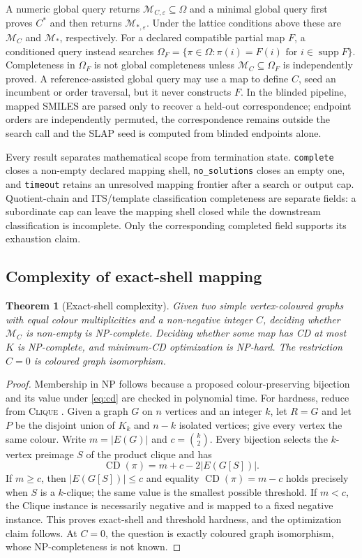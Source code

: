 \documentclass[11pt]{article}
\newtheorem{theorem}{Theorem}
\newcommand{\CD}{\operatorname{CD}}
\begin{document}
A numeric global query returns $\mathcal M_{C,\varepsilon}\subseteq\Omega$ and
a minimal global query first proves $C^*$ and then returns
$\mathcal M_{*,\varepsilon}$.  Under the lattice conditions above these are
$\mathcal M_C$ and $\mathcal M_*$, respectively.  For a declared compatible
partial map $F$, a conditioned query instead searches
$\Omega_F=\{\pi\in\Omega:\pi(i)=F(i)\text{ for }i\in\operatorname{supp}F\}$.
Completeness in $\Omega_F$ is not global completeness unless
$\mathcal M_C\subseteq\Omega_F$ is independently proved.  A
reference-assisted global query may use a map to define $C$, seed an incumbent
or order traversal, but it never constructs $F$.  In the blinded pipeline,
mapped SMILES are parsed only to recover a held-out correspondence; endpoint
orders are independently permuted, the correspondence remains outside the
search call and the SLAP seed is computed from blinded endpoints alone.

Every result separates mathematical scope from termination state.
\texttt{complete} closes a non-empty declared mapping shell,
\texttt{no\_solutions} closes an empty one, and \texttt{timeout} retains an
unresolved mapping frontier after a search or output cap.  Quotient-chain and
ITS/template classification completeness are separate fields: a subordinate
cap can leave the mapping shell closed while the downstream classification is
incomplete.  Only the corresponding completed field supports its exhaustion
claim.

\subsection*{Complexity of exact-shell mapping}

\begin{theorem}[Exact-shell complexity]
Given two simple vertex-coloured graphs with equal colour multiplicities and a
non-negative integer $C$, deciding whether $\mathcal M_C$ is non-empty is
NP-complete.  Deciding whether some map has CD at most $K$ is NP-complete, and
minimum-CD optimization is NP-hard.  The restriction $C=0$ is coloured graph
isomorphism.
\end{theorem}

\begin{proof}
Membership in NP follows because a proposed colour-preserving bijection and
its value under \cref{eq:cd} are checked in polynomial time.  For hardness,
reduce from \textsc{Clique}
\citep{karp1972reducibility}.  Given a graph $G$ on $n$ vertices and an integer
$k$, let $R=G$ and let $P$ be the disjoint union of $K_k$ and $n-k$ isolated
vertices; give every vertex the same colour.  Write $m=|E(G)|$ and
$c=\binom{k}{2}$.  Every bijection selects the $k$-vertex preimage $S$ of the
product clique and has
\[
 \CD(\pi)=m+c-2|E(G[S])|.
\]
If $m\geq c$, then $|E(G[S])|\leq c$ and equality
$\CD(\pi)=m-c$ holds precisely when $S$ is a $k$-clique; the same value is the
smallest possible threshold.  If $m<c$, the Clique instance is necessarily
negative and is mapped to a fixed negative instance.  This proves exact-shell
and threshold hardness, and the optimization claim follows.  At $C=0$, the
question is exactly coloured graph isomorphism, whose NP-completeness is not
known.
\end{proof}
\end{document}
